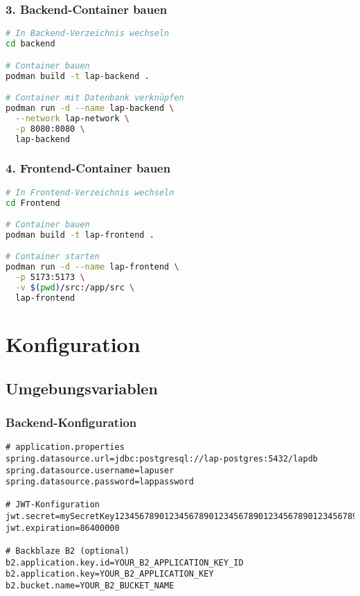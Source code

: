 \documentclass[a4paper,12pt]{article}
\begin{document}
\subsubsection{3. Backend-Container bauen}
\begin{lstlisting}[language=bash]
# In Backend-Verzeichnis wechseln
cd backend

# Container bauen
podman build -t lap-backend .

# Container mit Datenbank verknüpfen
podman run -d --name lap-backend \
  --network lap-network \
  -p 8080:8080 \
  lap-backend
\end{lstlisting}

\subsubsection{4. Frontend-Container bauen}
\begin{lstlisting}[language=bash]
# In Frontend-Verzeichnis wechseln
cd Frontend

# Container bauen
podman build -t lap-frontend .

# Container starten
podman run -d --name lap-frontend \
  -p 5173:5173 \
  -v $(pwd)/src:/app/src \
  lap-frontend
\end{lstlisting}

\section{Konfiguration}

\subsection{Umgebungsvariablen}

\subsubsection{Backend-Konfiguration}
\begin{lstlisting}[language=properties]
# application.properties
spring.datasource.url=jdbc:postgresql://lap-postgres:5432/lapdb
spring.datasource.username=lapuser
spring.datasource.password=lappassword

# JWT-Konfiguration
jwt.secret=mySecretKey123456789012345678901234567890123456789012345678901234567890
jwt.expiration=86400000

# Backblaze B2 (optional)
b2.application.key.id=YOUR_B2_APPLICATION_KEY_ID
b2.application.key=YOUR_B2_APPLICATION_KEY
b2.bucket.name=YOUR_B2_BUCKET_NAME
\end{lstlisting}
\end{document}
